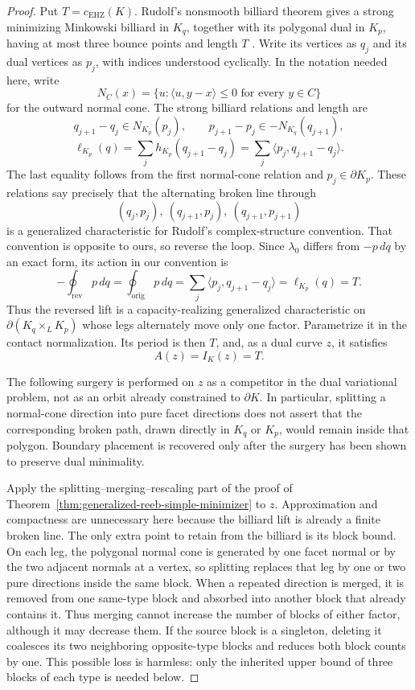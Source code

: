 \begin{proof}
Put \(T=c_{\mathrm{EHZ}}(K)\). Rudolf's nonsmooth billiard theorem gives a
strong minimizing Minkowski billiard in \(K_q\), together with its polygonal
dual in \(K_p\), having at most three bounce points and length \(T\)
\cite[Theorem~1]{Rudolf2022}. Write its vertices as \(q_j\) and its dual
vertices as \(p_j\), with indices understood cyclically.  In the notation
needed here, write
\[
  N_C(x)=\{u:\langle u,y-x\rangle\leq0\text{ for every }y\in C\}
\]
for the outward normal cone.  The strong billiard relations and length are
\[
  q_{j+1}-q_j\in N_{K_p}(p_j),
  \qquad
  p_{j+1}-p_j\in-N_{K_q}(q_{j+1}),
\]
\[
  \ell_{K_p}(q)
  =\sum_j h_{K_p}(q_{j+1}-q_j)
  =\sum_j\langle p_j,q_{j+1}-q_j\rangle.
\]
The last equality follows from the first normal-cone relation and
\(p_j\in\partial K_p\). These relations say precisely
that the alternating broken line through
\[
  (q_j,p_j),\ (q_{j+1},p_j),\ (q_{j+1},p_{j+1})
\]
is a generalized characteristic for Rudolf's complex-structure convention.
That convention is opposite to ours, so reverse the loop. Since \(\lambda_0\)
differs from \(-p\,dq\) by an exact form, its action in our convention is
\[
  -\oint_{\mathrm{rev}}p\,dq
  =\oint_{\mathrm{orig}}p\,dq
  =\sum_j\langle p_j,q_{j+1}-q_j\rangle
  =\ell_{K_p}(q)=T.
\]
Thus the reversed lift is a capacity-realizing generalized characteristic on
\(\partial(K_q\times_L K_p)\) whose legs alternately move only one factor.
Parametrize it in the contact normalization. Its period is then \(T\), and, as
a dual curve \(z\), it satisfies
\[
  A(z)=I_K(z)=T.
\]

The following surgery is performed on \(z\) as a competitor in the dual
variational problem, not as an orbit already constrained to \(\partial K\).
In particular, splitting a normal-cone direction into pure facet directions
does not assert that the corresponding broken path, drawn directly in
\(K_q\) or \(K_p\), would remain inside that polygon.  Boundary placement is
recovered only after the surgery has been shown to preserve dual minimality.

Apply the splitting--merging--rescaling part of the proof of
Theorem~\ref{thm:generalized-reeb-simple-minimizer} to \(z\). Approximation and
compactness are unnecessary here because the billiard lift is already a finite
broken line. The only extra point to retain from the billiard is its block
bound. On each leg, the polygonal normal cone is generated by one facet normal
or by the two adjacent normals at a vertex, so splitting replaces that leg by
one or two pure directions inside the same block. When a repeated direction is
merged, it is removed from one same-type block and absorbed into another block
that already contains it.  Thus merging cannot increase the number of blocks
of either factor, although it may decrease them.  If the source block is a
singleton, deleting it coalesces its two neighboring opposite-type blocks and
reduces both block counts by one.  This possible loss is harmless: only the
inherited upper bound of three blocks of each type is needed below.


\end{proof}
